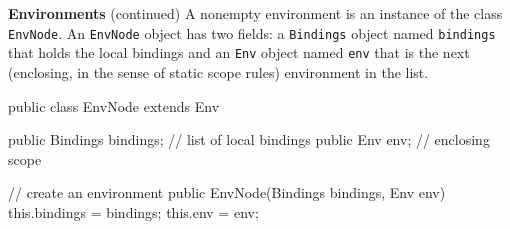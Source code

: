 \begin{minipage}[t]{\sw}
\slidenumber
\LARGE
{\bf Environments} (continued)\exx
A nonempty environment is an instance of the class \verb'EnvNode'.
An \verb'EnvNode' object has two fields:
a \verb'Bindings' object named \verb'bindings' that holds the local bindings
and an \verb'Env' object named \verb'env'
that is the next (enclosing, in the sense of static scope rules)
environment in the list.
\begin{qv}
public class EnvNode extends Env {

    public Bindings bindings; // list of local bindings
    public Env env;           // enclosing scope
    
    // create an environment 
    public EnvNode(Bindings bindings, Env env) {
        this.bindings = bindings;
        this.env = env;
    }

}
\end{qv}
\end{minipage}
